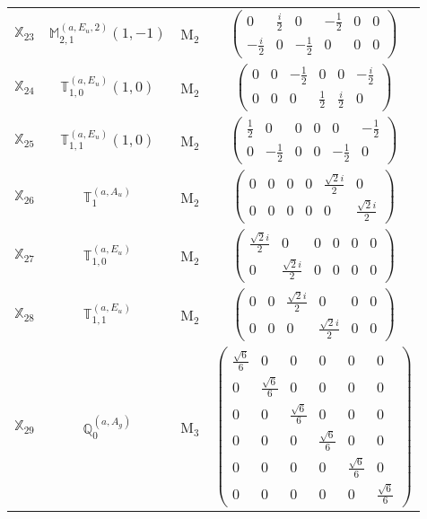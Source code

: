 \documentclass[fleqn,10pt,landscape]{article}
\begin{document}
\begin{itemize}
\begin{center}
\begin{longtable}{c|c|c|c}
$ \mathbb{X}_{23} $ & $\mathbb{M}_{2,1}^{(a,E_{u},2)}(1,-1)$ & M$_{2}$ & $\begin{pmatrix} 0 & \frac{i}{2} & 0 & - \frac{1}{2} & 0 & 0 \\ - \frac{i}{2} & 0 & - \frac{1}{2} & 0 & 0 & 0 \end{pmatrix}$ \\
$ \mathbb{X}_{24} $ & $\mathbb{T}_{1,0}^{(a,E_{u})}(1,0)$ & M$_{2}$ & $\begin{pmatrix} 0 & 0 & - \frac{1}{2} & 0 & 0 & - \frac{i}{2} \\ 0 & 0 & 0 & \frac{1}{2} & \frac{i}{2} & 0 \end{pmatrix}$ \\
$ \mathbb{X}_{25} $ & $\mathbb{T}_{1,1}^{(a,E_{u})}(1,0)$ & M$_{2}$ & $\begin{pmatrix} \frac{1}{2} & 0 & 0 & 0 & 0 & - \frac{1}{2} \\ 0 & - \frac{1}{2} & 0 & 0 & - \frac{1}{2} & 0 \end{pmatrix}$ \\
$ \mathbb{X}_{26} $ & $\mathbb{T}_{1}^{(a,A_{u})}$ & M$_{2}$ & $\begin{pmatrix} 0 & 0 & 0 & 0 & \frac{\sqrt{2} i}{2} & 0 \\ 0 & 0 & 0 & 0 & 0 & \frac{\sqrt{2} i}{2} \end{pmatrix}$ \\
$ \mathbb{X}_{27} $ & $\mathbb{T}_{1,0}^{(a,E_{u})}$ & M$_{2}$ & $\begin{pmatrix} \frac{\sqrt{2} i}{2} & 0 & 0 & 0 & 0 & 0 \\ 0 & \frac{\sqrt{2} i}{2} & 0 & 0 & 0 & 0 \end{pmatrix}$ \\
$ \mathbb{X}_{28} $ & $\mathbb{T}_{1,1}^{(a,E_{u})}$ & M$_{2}$ & $\begin{pmatrix} 0 & 0 & \frac{\sqrt{2} i}{2} & 0 & 0 & 0 \\ 0 & 0 & 0 & \frac{\sqrt{2} i}{2} & 0 & 0 \end{pmatrix}$ \\ \hline
$ \mathbb{X}_{29} $ & $\mathbb{Q}_{0}^{(a,A_{g})}$ & M$_{3}$ & $\begin{pmatrix} \frac{\sqrt{6}}{6} & 0 & 0 & 0 & 0 & 0 \\ 0 & \frac{\sqrt{6}}{6} & 0 & 0 & 0 & 0 \\ 0 & 0 & \frac{\sqrt{6}}{6} & 0 & 0 & 0 \\ 0 & 0 & 0 & \frac{\sqrt{6}}{6} & 0 & 0 \\ 0 & 0 & 0 & 0 & \frac{\sqrt{6}}{6} & 0 \\ 0 & 0 & 0 & 0 & 0 & \frac{\sqrt{6}}{6} \end{pmatrix}$ \\

\end{longtable}
\end{center}
\end{itemize}
\end{document}
